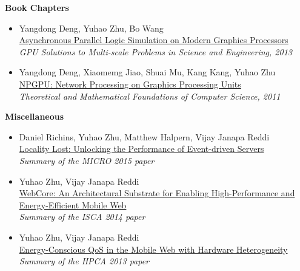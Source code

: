 \documentclass[margin, 9pt]{res} %
\begin{document}
\begin{resume}
\vspace*{7pt}
{\large\textbf{Book Chapters}}

\begin{itemize}[leftmargin=*] \itemsep 0pt
	\item Yangdong Deng, Yuhao Zhu, Bo Wang\\
          \href{http://link.springer.com/chapter/10.1007/978-3-642-16405-7_32}{Asynchronous Parallel Logic Simulation on Modern Graphics Processors}\\
          \textit{GPU Solutions to Multi-scale Problems in Science and Engineering, 2013}

	\item Yangdong Deng, Xiaomemg Jiao, Shuai Mu, Kang Kang, Yuhao Zhu\\
          \href{http://link.springer.com/chapter/10.1007/978-3-642-24999-0_44}{NPGPU: Network Processing on Graphics Processing Units}\\
          \textit{Theoretical and Mathematical Foundations of Computer Science, 2011}
\end{itemize}
 
\vspace*{7pt}
{\large\textbf{Miscellaneous}}

\begin{itemize}[leftmargin=*] \itemsep 0pt
	\item Daniel Richins, Yuhao Zhu, Matthew Halpern, Vijay Janapa Reddi\\
          \href{http://yuhaozhu.com/pubs/micro15-summary.pdf}{Locality Lost: Unlocking the Performance of Event-driven Servers}\\
          \textit{Summary of the MICRO 2015 paper}

	\item Yuhao Zhu, Vijay Janapa Reddi\\
          \href{http://yuhaozhu.com/pubs/isca14-summary.pdf}{WebCore: An Architectural Substrate for Enabling High-Performance and Energy-Efficient Mobile Web
}\\
          \textit{Summary of the ISCA 2014 paper}

	\item Yuhao Zhu, Vijay Janapa Reddi\\
          \href{http://yuhaozhu.com/pubs/hpca13-summary.pdf}{Energy-Conscious QoS in the Mobile Web with Hardware Heterogeneity}\\
          \textit{Summary of the HPCA 2013 paper}


\end{itemize}
\end{resume}
\end{document}
